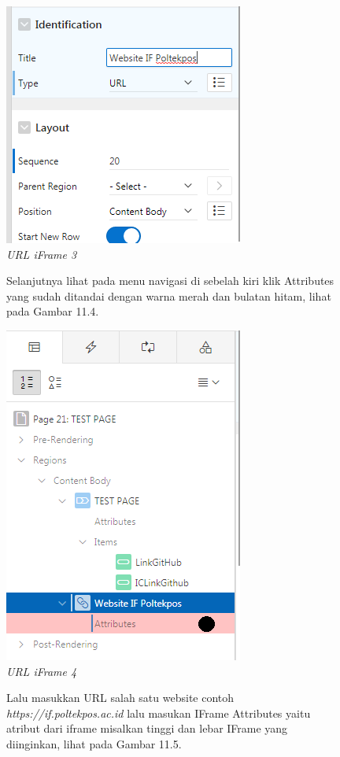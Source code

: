 \begin{enumerate}
\begin{figure}
        \centering
        \includegraphics[scale=0.5]{figures/bab12/3.png}
        \caption{\textit{URL iFrame 3}}
        \label{URL iFrame 3}
    \end{figure}
    
    \begin{figure}
    \item Selanjutnya lihat pada menu navigasi di sebelah kiri klik Attributes yang sudah ditandai dengan warna merah dan bulatan hitam, lihat pada Gambar 11.4.
        
        \centering
        \includegraphics[scale=0.5]{figures/bab12/4.png}
        \caption{\textit{URL iFrame 4}}
        \label{URL iFrame 4}
    \end{figure}
    
    \begin{figure}
    \item Lalu masukkan URL salah satu website contoh \textit{https://if.poltekpos.ac.id} lalu masukan IFrame Attributes yaitu atribut dari iframe misalkan tinggi dan lebar IFrame yang diinginkan, lihat pada Gambar 11.5.
        

\end{figure}
\end{enumerate}
